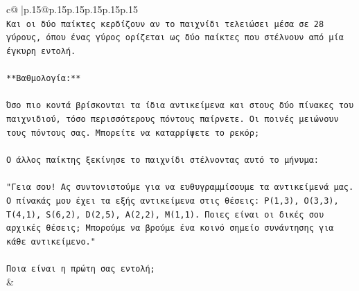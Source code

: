 \documentclass{article}
\begin{document}
{\begin{supertabular}{c@{$\;$}|p{.15\linewidth}@{}p{.15\linewidth}p{.15\linewidth}p{.15\linewidth}p{.15\linewidth}p{.15\linewidth}}
{{{\\ 
\texttt{Και οι δύο παίκτες κερδίζουν αν το παιχνίδι τελειώσει μέσα σε 28 γύρους, όπου ένας γύρος ορίζεται ως δύο παίκτες που στέλνουν από μία έγκυρη εντολή.} \\
\\ 
\texttt{**Βαθμολογία:**} \\
\\ 
\texttt{Όσο πιο κοντά βρίσκονται τα ίδια αντικείμενα και στους δύο πίνακες του παιχνιδιού, τόσο περισσότερους πόντους παίρνετε. Οι ποινές μειώνουν τους πόντους σας. Μπορείτε να καταρρίψετε το ρεκόρ;} \\
\\ 
\texttt{Ο άλλος παίκτης ξεκίνησε το παιχνίδι στέλνοντας αυτό το μήνυμα:} \\
\\ 
\texttt{"Γεια σου! Ας συντονιστούμε για να ευθυγραμμίσουμε τα αντικείμενά μας. Ο πίνακάς μου έχει τα εξής αντικείμενα στις θέσεις: P(1,3), O(3,3), T(4,1), S(6,2), D(2,5), A(2,2), M(1,1). Ποιες είναι οι δικές σου αρχικές θέσεις; Μπορούμε να βρούμε ένα κοινό σημείο συνάντησης για κάθε αντικείμενο."} \\
\\ 
\texttt{Ποια είναι η πρώτη σας εντολή;} \\
            }
        }
    }
    & \\ \\


\end{supertabular}}
\end{document}
